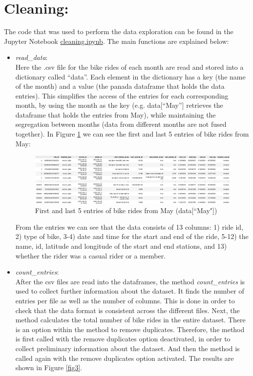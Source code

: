 \documentclass[12pt]{article}
\begin{document}
\section*{Cleaning:}
The code that was used to perform the data exploration can be found in the Jupyter Notebook \href{https://github.com/SummerKassem/BikeShareCS/blob/main/Code/cleaning.ipynb}{cleaning.ipynb}. The main functions are explained below:
\begin{itemize}
	\item \textit{read\_data}:\\
	Here the .csv file for the bike rides of each month are read and stored into a dictionary called “data”. Each element in the dictionary has a key (the name of the month) and a value (the panada dataframe that holds the data entries). This simplifies the access of the entries for each corresponding month, by using the month as the key (e.g. data[“May”] retrieves the dataframe that holds the entries from May), while maintaining the segregation between months (data from different months are not fused together). In Figure \ref{fig1} we can see the first and last 5 entries of bike rides from May:

	\begin{figure}[h]
	\hspace{-1.8cm}
	\includegraphics[width=8 in, height = 2 in]{imgMay.png}
	\caption{First and last 5 entries of bike rides from May (data[``May"])}
	\label{fig1}
	\end{figure}
	\pagebreak
	
	From the entries we can see that the data consists of 13 columns: 1) ride id, 2) type of bike, 3-4) date and time for the start and end of the ride, 5-12) the name, id, latitude and longitude of the start and end stations, and 13) whether the rider was a casual rider or a member. 
	
	\item \textit{count\_entries}:\\
	After the csv files are read into the dataframes, the method \textit{count\_entries} is used to collect further information about the dataset. It finds the number of entries per file as well as the number of columns. This is done in order to check that the data format is consistent across the different files. Next, the method calculates the total number of bike rides in the entire dataset. There is an option within the method to remove duplicates. Therefore, the method is first called with the remove duplicates option deactivated, in order to collect preliminary information about the dataset. And then the method is called again with the remove duplicates option activated. The results are shown in Figure \ref{fig3}. 
	

\end{itemize}
\end{document}
